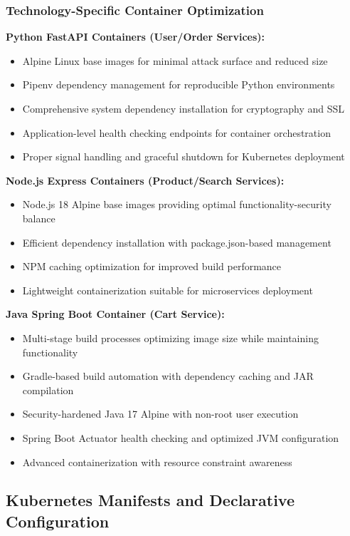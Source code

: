\subsubsection{Technology-Specific Container Optimization}

\textbf{Python FastAPI Containers (User/Order Services):}
\begin{itemize}
\item Alpine Linux base images for minimal attack surface and reduced size
\item Pipenv dependency management for reproducible Python environments
\item Comprehensive system dependency installation for cryptography and SSL
\item Application-level health checking endpoints for container orchestration
\item Proper signal handling and graceful shutdown for Kubernetes deployment
\end{itemize}

\textbf{Node.js Express Containers (Product/Search Services):}
\begin{itemize}
\item Node.js 18 Alpine base images providing optimal functionality-security balance
\item Efficient dependency installation with package.json-based management
\item NPM caching optimization for improved build performance
\item Lightweight containerization suitable for microservices deployment
\end{itemize}

\textbf{Java Spring Boot Container (Cart Service):}
\begin{itemize}
\item Multi-stage build processes optimizing image size while maintaining functionality
\item Gradle-based build automation with dependency caching and JAR compilation
\item Security-hardened Java 17 Alpine with non-root user execution
\item Spring Boot Actuator health checking and optimized JVM configuration
\item Advanced containerization with resource constraint awareness
\end{itemize}

\subsection{Kubernetes Manifests and Declarative Configuration}

